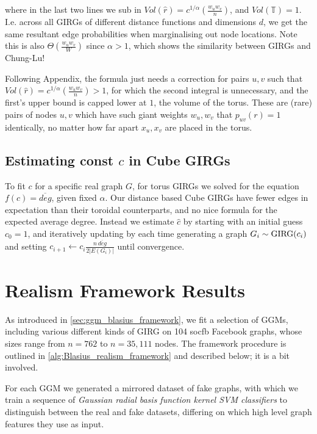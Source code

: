 where in the last two lines we sub in $Vol(\hat{r}) = c^{1/\alpha} \left (\frac{w_u w_v}{n} \right )$, and $Vol(\mathbb{T}) = 1$.
I.e. across all GIRGs of different distance functions and dimensions $d$, we get the same resultant edge probabilities when marginalising out node locations. Note this is also $\Theta(\frac{w_u w_v}{W})$ since $\alpha > 1$, which shows the similarity between GIRGs and Chung-Lu!

Following \cite{blasius2022efficiently} Appendix, the formula just needs a correction for pairs $u, v$ such that $Vol(\hat{r}) = c^{1/\alpha} \left ( \frac{w_u w_v}{n} \right ) > 1$, for which the second integral is unnecessary, and the first's upper bound is capped lower at $1$, the volume of the torus. These are (rare) pairs of nodes $u, v$ which have such giant weights $w_u, w_v$ that $p_{uv}(r) = 1$ identically, no matter how far apart $x_u, x_v$ are placed in the torus.



\subsection{Estimating const $c$ in Cube GIRGs}
To fit $c$ for a specific real graph $G$, for torus GIRGs we solved for the equation $f(c) = \overline{deg}$, given fixed $\alpha$. Our distance based Cube GIRGs have fewer edges in expectation than their toroidal counterparts, and no nice formula for the expected average degree. Instead we estimate $\hat{c}$ by starting with an initial guess $c_0=1$, and iteratively updating by each time generating a graph $G_i \sim \mathrm{GIRG}(c_i)$ and setting $c_{i+1} \gets c_i \frac{n \, \overline{deg}}{2 |E(G_i)|}$ until convergence.


\section{Realism Framework Results}
As introduced in \cref{sec:ggm_blasius_framework}, we fit a selection of GGMs, including various different kinds of GIRG on 104 socfb Facebook graphs, whose sizes range from $n=762$ to $n=35,111$ nodes. The framework procedure is outlined in \cref{alg:Blasius_realism_framework} and described below; it is a bit involved.

For each GGM we generated a mirrored dataset of fake graphs, with which we train a sequence of \textit{Gaussian radial basis function kernel SVM classifiers} to distinguish between the real and fake datasets, differing on which high level graph features they use as input.

